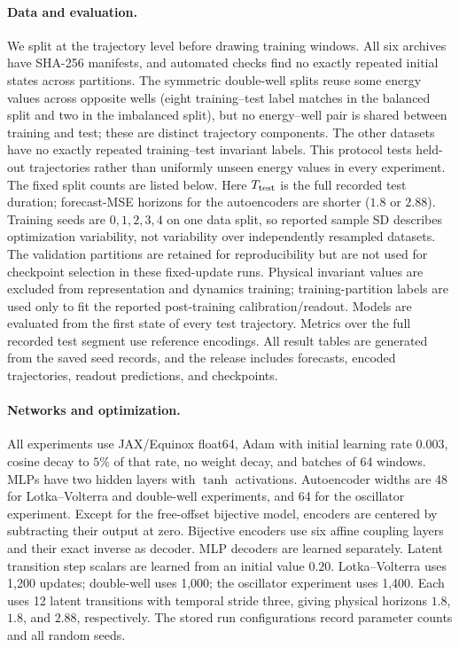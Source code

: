 \documentclass[10pt]{article}
\theoremstyle{definition}
\theoremstyle{remark}
\begin{document}
\paragraph{Data and evaluation.}
We split at the trajectory level before drawing training windows. All six archives have SHA-256 manifests, and automated checks find no exactly repeated initial states across partitions. The symmetric double-well splits reuse some energy values across opposite wells (eight training--test label matches in the balanced split and two in the imbalanced split), but no energy--well pair is shared between training and test; these are distinct trajectory components. The other datasets have no exactly repeated training--test invariant labels. This protocol tests held-out trajectories rather than uniformly unseen energy values in every experiment. The fixed split counts are listed below. Here $T_{\rm test}$ is the full recorded test duration; forecast-MSE horizons for the autoencoders are shorter ($1.8$ or $2.88$). Training seeds are $0,1,2,3,4$ on one data split, so reported sample SD describes optimization variability, not variability over independently resampled datasets. The validation partitions are retained for reproducibility but are not used for checkpoint selection in these fixed-update runs. Physical invariant values are excluded from representation and dynamics training; training-partition labels are used only to fit the reported post-training calibration/readout. Models are evaluated from the first state of every test trajectory. Metrics over the full recorded test segment use reference encodings. All result tables are generated from the saved seed records, and the release includes forecasts, encoded trajectories, readout predictions, and checkpoints.

\begin{center}

\end{center}

\paragraph{Networks and optimization.}
All experiments use JAX/Equinox float64, Adam with initial learning rate $0.003$, cosine decay to $5\%$ of that rate, no weight decay, and batches of 64 windows. MLPs have two hidden layers with $\tanh$ activations. Autoencoder widths are 48 for Lotka--Volterra and double-well experiments, and 64 for the oscillator experiment. Except for the free-offset bijective model, encoders are centered by subtracting their output at zero. Bijective encoders use six affine coupling layers and their exact inverse as decoder. MLP decoders are learned separately. Latent transition step scalars are learned from an initial value $0.20$. Lotka--Volterra uses 1,200 updates; double-well uses 1,000; the oscillator experiment uses 1,400. Each uses 12 latent transitions with temporal stride three, giving physical horizons $1.8$, $1.8$, and $2.88$, respectively. The stored run configurations record parameter counts and all random seeds.
\end{document}
